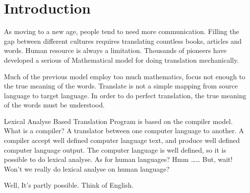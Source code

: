\documentclass[a4paper]{article}
\title{\LABTP}
\author{microcai}
\newcommand{\LABTP}{{Lexical Analyse Based Translation Program }}
\begin{document}
\maketitle

\begin{abstract}
\LABTP extends popular compiler model to support translating human languages.

\end{abstract}

\section{Introduction}

As moving to a new age, people tend to need more communication. Filling the gap
between different cultures requires translating countless books, articles and
words. Human resource is always a limitation. Thousands of pioneers have developed
a serious of Mathematical model for doing translation mechanically. 

Much of the previous model employ too much mathematics, focus not enough to the true meaning
of the words. Translate is not a simple mapping from source language to target language.
In order to do perfect translation, the true meaning of the words must be understood. 

\LABTP is based on the compiler model. What is a compiler? A translator between
one computer language to another. A compiler accept well defined computer language
text, and produce well defined computer language output. The computer language is well
defined, so it is possible to do lexical analyse. As for human languages? Hmm \ldots\ldots 
But, wait! Won't we really do lexical analyse on human language?

Well, It's partly possible. Think of English. 
\end{document}
